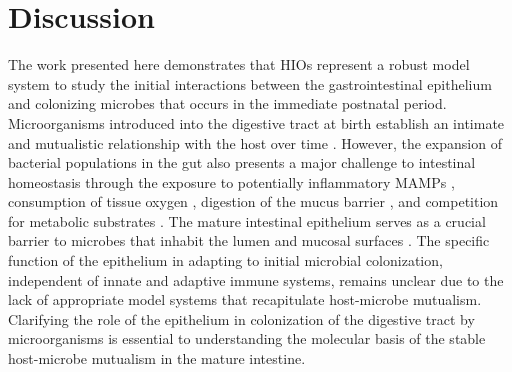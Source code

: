\documentclass[9pt,lineo]{elife}
\begin{document}
\section*{{\bfseries\sffamily } Discussion}
\label{sec:orgheadline11}
The work presented here demonstrates that HIOs represent a robust model system to study the initial interactions between the gastrointestinal epithelium and colonizing microbes that occurs in the immediate postnatal period. Microorganisms introduced into the digestive tract at birth establish an intimate and mutualistic relationship with the host over time \citep{Costello:2012,Palmer:2007,Koenig:2011,Backhed:2015,Wopereis:2014}. However, the expansion of bacterial populations in the gut also presents a major challenge to intestinal homeostasis through the exposure to potentially inflammatory MAMPs \citep{Tanner:2015,Renz:2012}, consumption of tissue oxygen \citep{Glover:2016,Espey:2013,Albenberg:2014}, digestion of the mucus barrier \citep{Marcobal:2013,Desai:2016}, and competition for metabolic substrates \citep{Rivera-Chavez:2016,Kaiko:2016}. The mature intestinal epithelium serves as a crucial barrier to microbes that inhabit the lumen and mucosal surfaces \citep{Artis:2008,Turner:2009,Desai:2016,Kelly:2015,Cornick:2015,Peterson:2014,Hackam:2013,Turner:2009}. The specific function of the epithelium in adapting to initial microbial colonization, independent of innate and adaptive immune systems, remains unclear due to the lack of appropriate model systems that recapitulate host-microbe mutualism. Clarifying the role of the epithelium in colonization of the digestive tract by microorganisms is essential to understanding the molecular basis of the stable host-microbe mutualism in the mature intestine.
\end{document}
